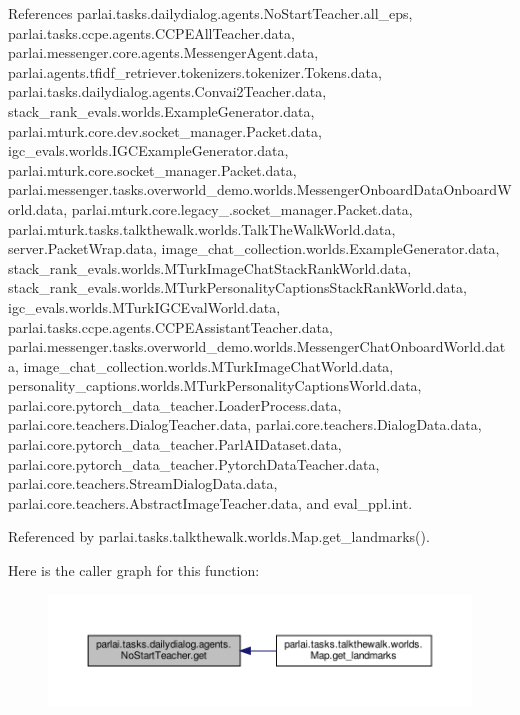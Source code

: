 References parlai.\+tasks.\+dailydialog.\+agents.\+No\+Start\+Teacher.\+all\+\_\+eps, parlai.\+tasks.\+ccpe.\+agents.\+C\+C\+P\+E\+All\+Teacher.\+data, parlai.\+messenger.\+core.\+agents.\+Messenger\+Agent.\+data, parlai.\+agents.\+tfidf\+\_\+retriever.\+tokenizers.\+tokenizer.\+Tokens.\+data, parlai.\+tasks.\+dailydialog.\+agents.\+Convai2\+Teacher.\+data, stack\+\_\+rank\+\_\+evals.\+worlds.\+Example\+Generator.\+data, parlai.\+mturk.\+core.\+dev.\+socket\+\_\+manager.\+Packet.\+data, igc\+\_\+evals.\+worlds.\+I\+G\+C\+Example\+Generator.\+data, parlai.\+mturk.\+core.\+socket\+\_\+manager.\+Packet.\+data, parlai.\+messenger.\+tasks.\+overworld\+\_\+demo.\+worlds.\+Messenger\+Onboard\+Data\+Onboard\+World.\+data, parlai.\+mturk.\+core.\+legacy\+\_.\+socket\+\_\+manager.\+Packet.\+data, parlai.\+mturk.\+tasks.\+talkthewalk.\+worlds.\+Talk\+The\+Walk\+World.\+data, server.\+Packet\+Wrap.\+data, image\+\_\+chat\+\_\+collection.\+worlds.\+Example\+Generator.\+data, stack\+\_\+rank\+\_\+evals.\+worlds.\+M\+Turk\+Image\+Chat\+Stack\+Rank\+World.\+data, stack\+\_\+rank\+\_\+evals.\+worlds.\+M\+Turk\+Personality\+Captions\+Stack\+Rank\+World.\+data, igc\+\_\+evals.\+worlds.\+M\+Turk\+I\+G\+C\+Eval\+World.\+data, parlai.\+tasks.\+ccpe.\+agents.\+C\+C\+P\+E\+Assistant\+Teacher.\+data, parlai.\+messenger.\+tasks.\+overworld\+\_\+demo.\+worlds.\+Messenger\+Chat\+Onboard\+World.\+data, image\+\_\+chat\+\_\+collection.\+worlds.\+M\+Turk\+Image\+Chat\+World.\+data, personality\+\_\+captions.\+worlds.\+M\+Turk\+Personality\+Captions\+World.\+data, parlai.\+core.\+pytorch\+\_\+data\+\_\+teacher.\+Loader\+Process.\+data, parlai.\+core.\+teachers.\+Dialog\+Teacher.\+data, parlai.\+core.\+teachers.\+Dialog\+Data.\+data, parlai.\+core.\+pytorch\+\_\+data\+\_\+teacher.\+Parl\+A\+I\+Dataset.\+data, parlai.\+core.\+pytorch\+\_\+data\+\_\+teacher.\+Pytorch\+Data\+Teacher.\+data, parlai.\+core.\+teachers.\+Stream\+Dialog\+Data.\+data, parlai.\+core.\+teachers.\+Abstract\+Image\+Teacher.\+data, and eval\+\_\+ppl.\+int.



Referenced by parlai.\+tasks.\+talkthewalk.\+worlds.\+Map.\+get\+\_\+landmarks().

Here is the caller graph for this function\+:
\nopagebreak
\begin{figure}[H]
\begin{center}
\leavevmode
\includegraphics[width=350pt]{classparlai_1_1tasks_1_1dailydialog_1_1agents_1_1NoStartTeacher_a9ba392a1d4730fdd27f275d0f19c7149_icgraph}
\end{center}
\end{figure}


